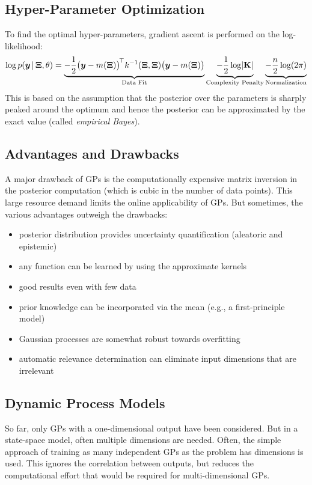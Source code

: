 		\subsection{Hyper-Parameter Optimization}
			To find the optimal hyper-parameters, gradient ascent is performed on the log-likelihood:
			\begin{equation}
				\log p(\bm{y} \,\vert\, \bm{\mathrm{\Xi}}, \theta)
					= \underbrace{-\frac{1}{2} \bigl( \bm{y} - m(\bm{\mathrm{\Xi}}) \bigr)^{\!\top} k^{-1}(\bm{\mathrm{\Xi}}, \bm{\mathrm{\Xi}}) \bigl( \bm{y} - m(\bm{\mathrm{\Xi}}) \bigr)}_\text{Data Fit}
					  \underbrace{-\frac{1}{2} \log \lvert \bm{\mathrm{K}} \rvert}_\text{Complexity Penalty}
					  \underbrace{-\frac{n}{2} \log(2\pi)}_\text{Normalization}
			\end{equation}
			This is based on the assumption that the posterior over the parameters is sharply peaked around the optimum and hence the posterior can be approximated by the exact value (called \emph{empirical Bayes}).

		\subsection{Advantages and Drawbacks}
			A major drawback of GPs is the computationally expensive matrix inversion in the posterior computation (which is cubic in the number of data points). This large resource demand limits the online applicability of GPs. But sometimes, the various advantages outweigh the drawbacks:
			\begin{itemize}
				\item posterior distribution provides uncertainty quantification (aleatoric and epistemic)
				\item any function can be learned by using the approximate kernels
				\item good results even with few data
				\item prior knowledge can be incorporated via the mean (e.g., a first-principle model)
				\item Gaussian processes are somewhat robust towards overfitting
				\item automatic relevance determination can eliminate input dimensions that are irrelevant
			\end{itemize}

		\subsection{Dynamic Process Models}
			So far, only GPs with a one-dimensional output have been considered. But in a state-space model, often multiple dimensions are needed. Often, the simple approach of training as many independent GPs as the problem has dimensions is used. This ignores the correlation between outputs, but reduces the computational effort that would be required for multi-dimensional GPs.

